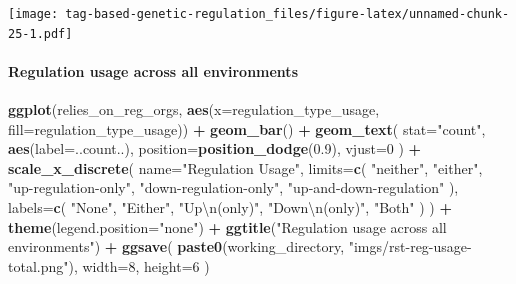 \documentclass[
]{book}
\newenvironment{Shaded}{\begin{snugshade}}{\end{snugshade}}
\newcommand{\CharTok}[1]{\textcolor[rgb]{0.31,0.60,0.02}{#1}}
\newcommand{\DataTypeTok}[1]{\textcolor[rgb]{0.13,0.29,0.53}{#1}}
\newcommand{\DecValTok}[1]{\textcolor[rgb]{0.00,0.00,0.81}{#1}}
\newcommand{\FloatTok}[1]{\textcolor[rgb]{0.00,0.00,0.81}{#1}}
\newcommand{\KeywordTok}[1]{\textcolor[rgb]{0.13,0.29,0.53}{\textbf{#1}}}
\newcommand{\NormalTok}[1]{#1}
\newcommand{\OperatorTok}[1]{\textcolor[rgb]{0.81,0.36,0.00}{\textbf{#1}}}
\newcommand{\StringTok}[1]{\textcolor[rgb]{0.31,0.60,0.02}{#1}}
\begin{document}
\texttt{[image: tag-based-genetic-regulation\_files/figure-latex/unnamed-chunk-25-1.pdf]}

\hypertarget{regulation-usage-across-all-environments}{%
\paragraph{Regulation usage across all environments}\label{regulation-usage-across-all-environments}}

\begin{Shaded}
\begin{Highlighting}[]
\KeywordTok{ggplot}\NormalTok{(relies\_on\_reg\_orgs, }\KeywordTok{aes}\NormalTok{(}\DataTypeTok{x=}\NormalTok{regulation\_type\_usage, }\DataTypeTok{fill=}\NormalTok{regulation\_type\_usage)) }\OperatorTok{+}
\StringTok{  }\KeywordTok{geom\_bar}\NormalTok{() }\OperatorTok{+}
\StringTok{  }\KeywordTok{geom\_text}\NormalTok{(}
    \DataTypeTok{stat=}\StringTok{"count"}\NormalTok{,}
    \KeywordTok{aes}\NormalTok{(}\DataTypeTok{label=}\NormalTok{..count..),}
    \DataTypeTok{position=}\KeywordTok{position\_dodge}\NormalTok{(}\FloatTok{0.9}\NormalTok{),}
    \DataTypeTok{vjust=}\DecValTok{0}
\NormalTok{  ) }\OperatorTok{+}
\StringTok{  }\KeywordTok{scale\_x\_discrete}\NormalTok{(}
    \DataTypeTok{name=}\StringTok{"Regulation Usage"}\NormalTok{,}
    \DataTypeTok{limits=}\KeywordTok{c}\NormalTok{(}
      \StringTok{"neither"}\NormalTok{,}
      \StringTok{"either"}\NormalTok{,}
      \StringTok{"up{-}regulation{-}only"}\NormalTok{,}
      \StringTok{"down{-}regulation{-}only"}\NormalTok{,}
      \StringTok{"up{-}and{-}down{-}regulation"}
\NormalTok{    ),}
    \DataTypeTok{labels=}\KeywordTok{c}\NormalTok{(}
      \StringTok{"None"}\NormalTok{,}
      \StringTok{"Either"}\NormalTok{,}
      \StringTok{"Up}\CharTok{\textbackslash{}n}\StringTok{(only)"}\NormalTok{,}
      \StringTok{"Down}\CharTok{\textbackslash{}n}\StringTok{(only)"}\NormalTok{,}
      \StringTok{"Both"}
\NormalTok{    )}
\NormalTok{  ) }\OperatorTok{+}
\StringTok{  }\KeywordTok{theme}\NormalTok{(}\DataTypeTok{legend.position=}\StringTok{"none"}\NormalTok{) }\OperatorTok{+}
\StringTok{  }\KeywordTok{ggtitle}\NormalTok{(}\StringTok{"Regulation usage across all environments"}\NormalTok{) }\OperatorTok{+}
\StringTok{  }\KeywordTok{ggsave}\NormalTok{(}
    \KeywordTok{paste0}\NormalTok{(working\_directory, }\StringTok{"imgs/rst{-}reg{-}usage{-}total.png"}\NormalTok{),}
    \DataTypeTok{width=}\DecValTok{8}\NormalTok{,}
    \DataTypeTok{height=}\DecValTok{6}
\NormalTok{  )}
\end{Highlighting}
\end{Shaded}
\end{document}
